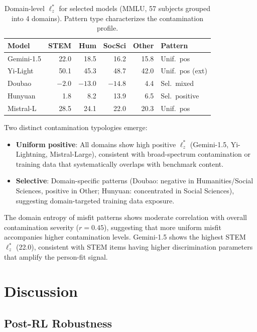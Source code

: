 \documentclass[11pt,a4paper]{article}
\begin{document}
\begin{table}[t]
\centering
\caption{Domain-level $\ell_z^*$ for selected models (MMLU, 57 subjects grouped into 4 domains). Pattern type characterizes the contamination profile.}
\label{tab:domain}
\small
\begin{tabular}{lrrrrl}
\toprule
Model & STEM & Hum & SocSci & Other & Pattern \\
\midrule
Gemini-1.5 & 22.0 & 18.5 & 16.2 & 15.8 & Unif.\ pos \\
Yi-Light & 50.1 & 45.3 & 48.7 & 42.0 & Unif.\ pos (ext) \\
Doubao & $-2.0$ & $-13.0$ & $-14.8$ & 4.4 & Sel.\ mixed \\
Hunyuan & 1.8 & 8.2 & 13.9 & 6.5 & Sel.\ positive \\
Mistral-L & 28.5 & 24.1 & 22.0 & 20.3 & Unif.\ pos \\
\bottomrule
\end{tabular}
\end{table}

Two distinct contamination typologies emerge:
\begin{itemize}
\item \textbf{Uniform positive}: All domains show high positive $\ell_z^*$ (Gemini-1.5, Yi-Lightning, Mistral-Large), consistent with broad-spectrum contamination or training data that systematically overlaps with benchmark content.
\item \textbf{Selective}: Domain-specific patterns (Doubao: negative in Humanities/Social Sciences, positive in Other; Hunyuan: concentrated in Social Sciences), suggesting domain-targeted training data exposure.
\end{itemize}

The domain entropy of misfit patterns shows moderate correlation with overall contamination severity ($r=0.45$), suggesting that more uniform misfit accompanies higher contamination levels.
Gemini-1.5 shows the highest STEM $\ell_z^*$ (22.0), consistent with STEM items having higher discrimination parameters that amplify the person-fit signal.

\section{Discussion}

\subsection{Post-RL Robustness}
\label{sec:post-rl}
\end{document}
